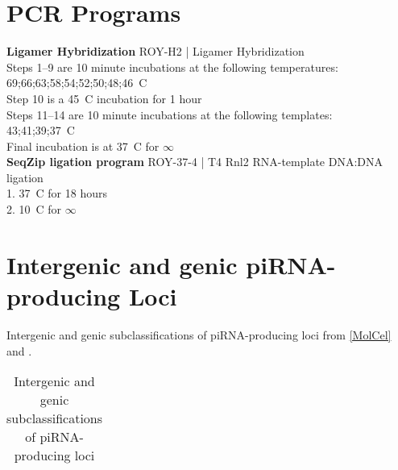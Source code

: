 \section{PCR Programs}\label{AppendixMisc:sec:PCR Programs}

\textbf{Ligamer Hybridization}
ROY-H2 | Ligamer Hybridization\\
  Steps 1–9 are 10 minute incubations at the following temperatures:\\
  69;66;63;58;54;52;50;48;46\degree~C\\
  Step 10 is a 45\degree~C incubation for 1 hour\\
  Steps 11–14 are 10 minute incubations at the following templates:\\
  43;41;39;37\degree~C\\
  Final incubation is at 37\degree~C for $\infty$\\

\textbf{SeqZip ligation program}
ROY-37-4 | T4 Rnl2 RNA-template DNA:DNA ligation\\
  1. 37\degree~C for 18 hours\\
  2. 10\degree~C for $\infty$ \\

\section{Intergenic and genic piRNA-producing Loci}

Intergenic and genic subclassifications of piRNA-producing loci from \ref{MolCel} and \citep{Li2013e}.

\begin{longtable}{p{4cm}p{2cm}p{4cm}p{2cm}} %
  \caption[Intergenic and genic subclassifications of piRNA-producing loci]
  {Intergenic and genic subclassifications of piRNA-producing loci}
  \label{Appendix:tab:GenicAndInterGenicLoci}
  
  \end{longtable}


